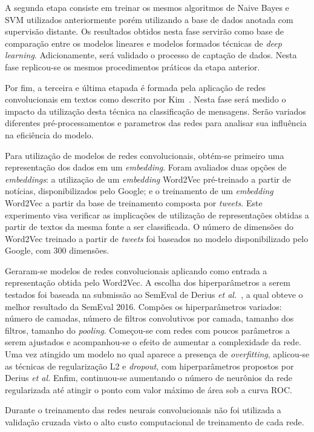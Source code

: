 A segunda etapa consiste em treinar os mesmos algoritmos de Naive Bayes e SVM utilizados anteriormente porém utilizando
a base de dados anotada com supervisão distante.
Os resultados obtidos nesta fase servirão como base de comparação entre os modelos lineares e modelos formados técnicas
de \textit{deep learning}.
Adicionamente, será validado o processo de captação de dados.
Nesta fase replicou-se os mesmos procedimentos práticos da etapa anterior.

Por fim, a terceira e última etapada é formada pela aplicação de redes convolucionais em textos como descrito por
Kim~\cite{kim14}.
Nesta fase será medido o impacto da utilização desta técnica na classificação de mensagens.
Serão variados diferentes pré-processamentos e parametros das redes para analisar sua influência na eficiência do
modelo.

Para utilização de modelos de redes convolucionais, obtém-se primeiro uma representação dos dados em um
\textit{embedding}.
Foram avaliados duas opções de \textit{embeddings}: a utilização de um \textit{embedding} Word2Vec pré-treinado a
partir de notícias, disponibilizados pelo Google; e o treinamento de um \textit{embedding} Word2Vec a partir da base de
treinamento composta por \textit{tweets}.
Este experimento visa verificar as implicações de utilização de representações obtidas a partir de textos da mesma
fonte a ser classificada.
O número de dimensões do Word2Vec treinado a partir de \textit{tweets} foi baseados no modelo disponibilizado pelo
Google, com 300 dimensões.

Geraram-se modelos de redes convolucionais aplicando como entrada a representação obtida pelo Word2Vec.
A escolha dos hiperparâmetros a serem testados foi baseada na submissão ao SemEval de Derius
\textit{et al.}~\cite{deriu16}, a qual obteve o melhor resultado da SemEval 2016.
Compões os hiperparâmetros variados: número de camadas, número de filtros convolutivos por camada, tamanho dos filtros,
tamanho do \textit{pooling}.
Começou-se com redes com poucos parâmetros a serem ajustados e acompanhou-se o efeito de aumentar a complexidade da
rede.
Uma vez atingido um modelo no qual aparece a presença de \textit{overfitting}, aplicou-se as técnicas de regularização L2
e \textit{dropout}, com hiperparâmetros propostos por Derius \textit{et al.}
Enfim, continuou-se aumentando o número de neurônios da rede regularizada até atingir o ponto com valor máximo de área
sob a curva ROC.

Durante o treinamento das redes neurais convolucionais não foi utilizada a validação cruzada visto o alto custo
computacional de treinamento de cada rede.

